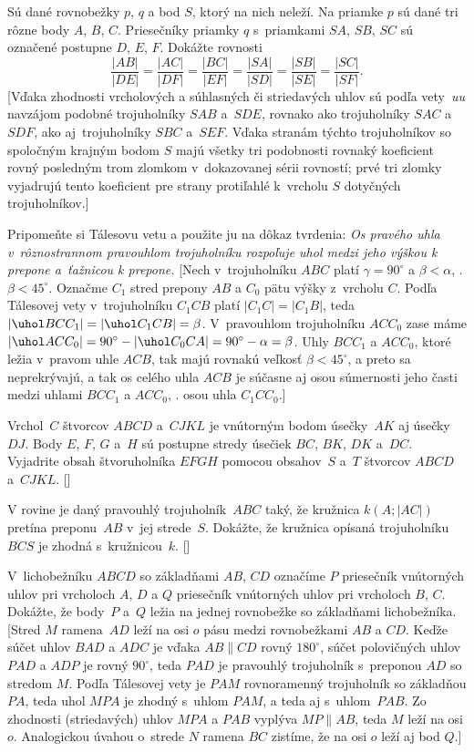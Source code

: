 {Sú dané rovnobežky $p$, $q$ a bod $S$, ktorý na nich
neleží. Na priamke $p$ sú dané tri rôzne body $A$, $B$, $C$.
Priesečníky priamky $q$ s~priamkami
$SA$, $SB$, $SC$ sú označené postupne $D$, $E$, $F$.
Dokážte rovnosti
$$
\frac{|AB|}{|DE|}=\frac{|AC|}{|DF|}=\frac{|BC|}{|EF|}=
\frac{|SA|}{|SD|}=\frac{|SB|}{|SE|}=\frac{|SC|}{|SF|}.
$$
[Vďaka zhodnosti vrcholových a súhlasných či striedavých uhlov
sú podľa vety~\emph{uu} navzájom podobné trojuholníky $SAB$ a~$SDE$,
rovnako ako trojuholníky $SAC$ a~$SDF$, ako aj~trojuholníky $SBC$ a~$SEF$. Vďaka stranám týchto trojuholníkov so spoločným krajným bodom $S$
majú všetky tri podobnosti rovnaký koeficient rovný posledným
trom zlomkom v~dokazovanej sérii rovností; prvé tri zlomky
vyjadrujú tento koeficient pre strany protiľahlé k~vrcholu $S$
dotyčných trojuholníkov.]

Pripomeňte si Tálesovu vetu a použite ju na dôkaz tvrdenia: {\sl Os
pravého uhla v~rôznostrannom pravouhlom trojuholníku rozpoľuje uhol medzi jeho
výškou k prepone a~ťažnicou k prepone.}
[Nech v~trojuholníku $ABC$ platí $\gamma=90^{\circ}$ a $\beta<\alpha$, \tj.
$\beta<45^{\circ}$. Označme $C_1$ stred prepony $AB$
a $C_0$ pätu výšky z~vrcholu $C$. Podľa Tálesovej vety v~trojuholníku $C_1CB$
platí $|C_1C|=|C_1B|$, teda $|\uhol BCC_1|=|\uhol C_1CB|=\beta$.
V~pravouhlom trojuholníku $ACC_0$ zase máme $|\uhol ACC_0|=90^{\circ}-|\uhol
C_0CA|={90^{\circ}-\alpha}=\beta$. Uhly $BCC_1$ a $ACC_0$, ktoré ležia
v~pravom uhle $ACB$, tak majú rovnakú veľkosť $\beta<45^{\circ}$, a preto
sa neprekrývajú, a tak os celého uhla $ACB$ je súčasne
aj osou súmernosti jeho  časti medzi uhlami $BCC_1$ a $ACC_0$,
\tj. osou uhla $C_1CC_0$.]

\D
Vrchol~$C$ štvorcov $ABCD$ a~$CJKL$ je vnútorným bodom
úsečky~$AK$ aj úsečky~$DJ$. Body $E$, $F$, $G$ a~$H$ sú postupne stredy
úsečiek $BC$, $BK$, $DK$ a~$DC$. Vyjadrite obsah štvoruholníka $EFGH$ pomocou obsahov~$S$ a~$T$ štvorcov $ABCD$ a~$CJKL$.
[]

V rovine je daný pravouhlý trojuholník~$ABC$ taký, že kružnica $k(A;|AC|)$ pretína
preponu~$AB$ v~jej strede~$S$. Dokážte, že kružnica opísaná trojuholníku~$BCS$
je zhodná s~kružnicou~$k$.
[]

V~lichobežníku $ABCD$ so základňami $AB$, $CD$ označíme $P$
priesečník vnútorných uhlov pri vrcholoch $A$, $D$ a $Q$ priesečník vnútorných
uhlov pri vrcholoch $B$, $C$. Dokážte, že body~$P$ a~$Q$ ležia na jednej
rovnobežke so základňami lichobežníka.
[Stred $M$ ramena~$AD$ leží na osi $o$ pásu medzi rovnobežkami $AB$ a
$CD$. Keďže súčet uhlov $BAD$ a $ADC$ je vďaka $AB\parallel CD$
rovný $180^{\circ}$, súčet polovičných uhlov $PAD$ a $ADP$ je
rovný $90^{\circ}$, teda $PAD$ je pravouhlý trojuholník s~preponou
$AD$ so stredom $M$. Podľa Tálesovej vety je $PAM$ rovnoramenný
trojuholník so základňou $PA$, teda uhol $MPA$ je zhodný s~uhlom $PAM$,
a teda aj s~uhlom~$PAB$. Zo zhodnosti (striedavých) uhlov $MPA$ a $PAB$
vyplýva $MP\parallel AB$, teda $M$ leží na osi $o$. Analogickou úvahou
o~strede $N$ ramena $BC$ zistíme, že na osi $o$ leží aj bod $Q$.]
}

